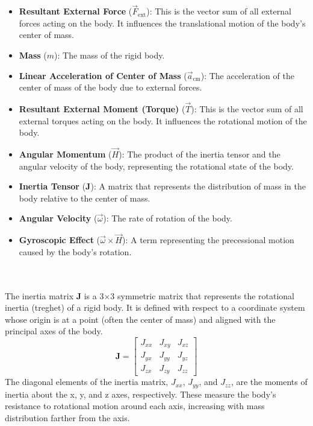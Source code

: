 \begin{itemize}
    \item \textbf{Resultant External Force} (\( \vec{F}_{\text{ext}} \)): This is the vector sum of all external forces acting on the body. It influences the translational motion of the body's center of mass.
    \item \textbf{Mass} (\( m \)): The mass of the rigid body.
    \item \textbf{Linear Acceleration of Center of Mass} (\( \vec{a}_{\text{cm}} \)): The acceleration of the center of mass of the body due to external forces.
    \item \textbf{Resultant External Moment (Torque)} (\( \vec{T} \)): This is the vector sum of all external torques acting on the body. It influences the rotational motion of the body.
    \item \textbf{Angular Momentum} (\( \vec{H} \)): The product of the inertia tensor and the angular velocity of the body, representing the rotational state of the body.
    \item \textbf{Inertia Tensor} (\( \mathbf{J} \)): A matrix that represents the distribution of mass in the body relative to the center of mass.
    \item \textbf{Angular Velocity} (\( \vec{\omega} \)): The rate of rotation of the body.
    \item \textbf{Gyroscopic Effect} (\( \vec{\omega} \times \vec{H} \)): A term representing the precessional motion caused by the body's rotation.
\end{itemize}
\\
\\
The inertia matrix \textbf{J} is a 3×3 symmetric matrix that represents the rotational inertia (treghet) of a rigid body. It is defined with respect to a coordinate system whose origin is at a point (often the center of mass) and aligned with the principal axes of the body.
\[
\mathbf{J} = \begin{bmatrix}
    J_{xx} & J_{xy} & J_{xz} \\
    J_{yx} & J_{yy} & J_{yz} \\
    J_{zx} & J_{zy} & J_{zz}
\end{bmatrix}
\]
The diagonal elements of the inertia matrix, \( J_{xx} \), \( J_{yy} \), and \( J_{zz} \), are the moments of inertia about the x, y, and z axes, respectively. These measure the body's resistance to rotational motion around each axis, increasing with mass distribution farther from the axis.
\\
